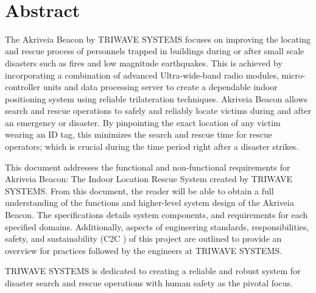 
\
\section*{Abstract}	%
\medskip
The Akriveia Beacon by TRIWAVE SYSTEMS focuses on improving the locating and rescue process of personnels trapped in buildings during or after small scale disasters such as fires and low magnitude earthquakes. This is achieved by incorporating a combination of advanced Ultra-wide-band radio modules, micro-controller units and data processing server to create a dependable indoor positioning system using reliable trilateration techniques. Akriveia Beacon allows search and rescue operations to safely and reliably locate victims during and after an emergency or disaster. By pinpointing the exact location of any victim wearing an ID tag, this minimizes the search and rescue time for rescue operators; which is crucial during the time period right after a disaster strikes.

\bigskip
This document addresses the functional and non-functional requirements for Akriveia Beacon: The Indoor Location Rescue System created by TRIWAVE SYSTEMS. From this document, the reader will be able to obtain a full understanding of the functions and higher-level system design of the Akriveia Beacon. The specifications details system components, and requirements for each specified domains. Additionally, aspects of engineering standards, responsibilities, safety, and sustainability (C2C \cite{R25}) of this project are outlined to provide an overview for practices followed by the engineers at TRIWAVE SYSTEMS.

\bigskip
TRIWAVE SYSTEMS is dedicated to creating a reliable and robust system for disaster search and rescue operations with human safety as the pivotal focus.

%